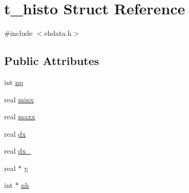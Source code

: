 \hypertarget{structt__histo}{\section{t\-\_\-histo \-Struct \-Reference}
\label{structt__histo}
}


{\ttfamily \#include $<$ehdata.\-h$>$}

\subsection*{\-Public \-Attributes}
\begin{DoxyCompactItemize}
\item 
int \hyperlink{structt__histo_ae1b723e8784af9c058a5fb8db150cca2}{np}
\item 
real \hyperlink{structt__histo_a169193dcbcd7e2c6149afabc2cb041e2}{minx}
\item 
real \hyperlink{structt__histo_a8e6d60a954f1a7c126480e90e39b3ddd}{maxx}
\item 
real \hyperlink{structt__histo_a9edd12533230675c2ca282bf39e7ad4f}{dx}
\item 
real \hyperlink{structt__histo_ae3ce29279673f1d941fd5733d7936ae0}{dx\-\_}
\item 
real $\ast$ \hyperlink{structt__histo_af2022210cbb5cd0225c34251dcd59da9}{y}
\item 
int $\ast$ \hyperlink{structt__histo_a0fe0f858ac238e33a2a346499cd70fa6}{nh}
\end{DoxyCompactItemize}


